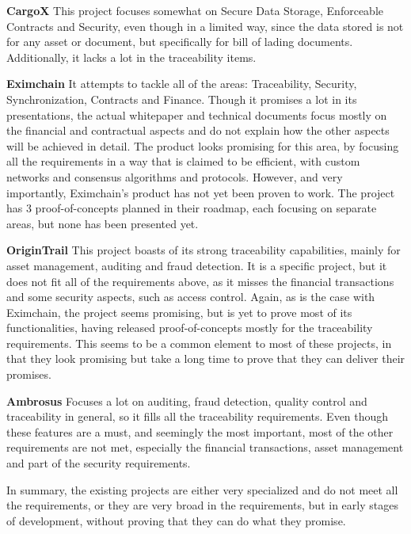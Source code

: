 \par \textbf{CargoX} This project focuses somewhat on Secure Data Storage, Enforceable Contracts and Security, even though in a limited way, since the data stored is not for any asset or document, but specifically for bill of lading documents. Additionally, it lacks a lot in the traceability items.

\par \textbf{Eximchain} It attempts to tackle all of the areas: Traceability, Security, Synchronization, Contracts and Finance. Though it promises a lot in its presentations, the actual whitepaper and technical documents focus mostly on the financial and contractual aspects and do not explain how the other aspects will be achieved in detail. The product looks promising for this area, by focusing all the requirements in a way that is claimed to be efficient, with custom networks and consensus algorithms and protocols. However, and very importantly, Eximchain's product has not yet been proven to work. The project has 3 proof-of-concepts planned in their roadmap, each focusing on separate areas, but none has been presented yet.

\par \textbf{OriginTrail} This project boasts of its strong traceability capabilities, mainly for asset management, auditing and fraud detection. It is a specific project, but it does not fit all of the requirements above,  as it misses the financial transactions and some security aspects, such as access control. Again, as is the case with Eximchain, the project seems promising, but is yet to prove most of its functionalities, having released proof-of-concepts mostly for the traceability requirements. This seems to be a common element to most of these projects, in that they look promising but take a long time to prove that they can deliver their promises.

\par \textbf{Ambrosus} Focuses a lot on auditing, fraud detection, quality control and traceability in general, so it fills all the traceability requirements. Even though these features are a must, and seemingly the most important, most of the other requirements are not met, especially the financial transactions, asset management and part of the security requirements.

In summary, the existing projects are either very specialized and do not meet all the requirements, or they are very broad in the requirements, but in early stages of development, without proving that they can do what they promise.